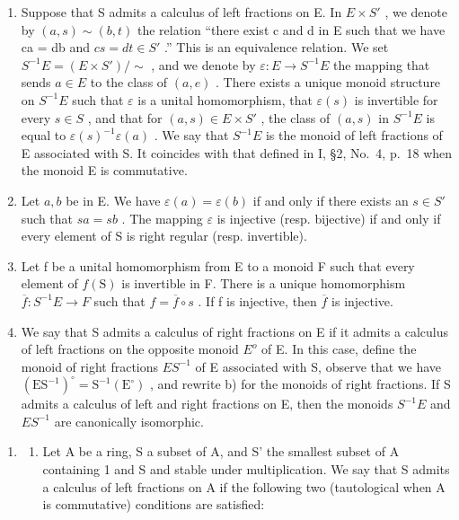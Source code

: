 \begin{enumerate}
\def\labelenumi{\alph{enumi})}
\setcounter{enumi}{1}
\item
  Suppose that S admits a calculus of left fractions on E. In \(E \times S'\) , we denote by \((a, s) \sim (b, t)\) the relation ``there exist c and d in E such that we have ca = db and \(cs = dt \in S'\) .'' This is an equivalence relation. We set \(S^{-1}E = (E \times S') / \sim\) , and we denote by \(\varepsilon : E \to S^{-1}E\) the mapping that sends \(a \in E\) to the class of \((a, e)\) . There exists a unique monoid structure on \(S^{-1}E\) such that \(\varepsilon\) is a unital homomorphism, that \(\varepsilon(s)\) is invertible for every \(s \in S\) , and that for \((a, s) \in E \times S'\) , the class of \((a, s)\) in \(S^{-1}E\) is equal to \(\varepsilon(s)^{-1}\varepsilon(a)\) . We say that \(S^{-1}E\) is the monoid of left fractions of E associated with S. It coincides with that defined in I, §2, No.~4, p.~18 when the monoid E is commutative.
\item
  Let \(a, b\) be in E. We have \(\varepsilon(a) = \varepsilon(b)\) if and only if there exists an \(s \in S'\) such that \(sa = sb\) . The mapping \(\varepsilon\) is injective (resp. bijective) if and only if every element of S is right regular (resp. invertible).
\item
  Let f be a unital homomorphism from E to a monoid F such that every element of \(f(\mathrm{S})\) is invertible in F. There is a unique homomorphism \(\overline{f}: S^{-1}E \to F\) such that \(f = \overline{f} \circ s\) . If f is injective, then \(\overline{f}\) is injective.
\item
  We say that S admits a calculus of right fractions on E if it admits a calculus of left fractions on the opposite monoid \(E^{o}\) of E. In this case, define the monoid of right fractions \(ES^{-1}\) of E associated with S, observe that we have \((\mathrm{ES}^{-1})^{\circ} = \mathrm{S}^{-1}(\mathrm{E}^{\circ})\) , and rewrite b) for the monoids of right fractions. If S admits a calculus of left and right fractions on E, then the monoids \(S^{-1}E\) and \(ES^{-1}\) are canonically isomorphic.
\end{enumerate}

\begin{enumerate}
\def\labelenumi{\arabic{enumi})}
\setcounter{enumi}{17}
\tightlist
\item
  \begin{enumerate}
  \def\labelenumii{\alph{enumii})}
  \tightlist
  \item
    Let A be a ring, S a subset of A, and S' the smallest subset of A containing 1 and S and stable under multiplication. We say that S admits a calculus of left fractions on A if the following two (tautological when A is commutative) conditions are satisfied:
  \end{enumerate}
\end{enumerate}

